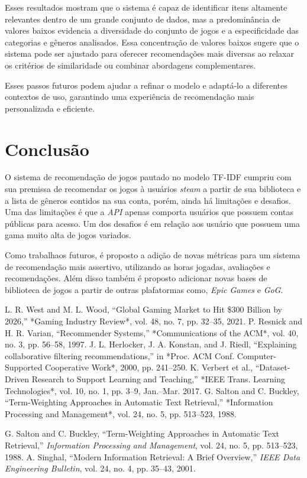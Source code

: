 \documentclass[conference]{IEEEtran}
\begin{document}
Esses resultados mostram que o sistema é capaz de identificar itens altamente relevantes dentro de um grande conjunto de dados, mas a predominância de valores baixos evidencia a diversidade do conjunto de jogos e a especificidade das categorias e gêneros analisados. Essa concentração de valores baixos sugere que o sistema pode ser ajustado para oferecer recomendações mais diversas ao relaxar os critérios de similaridade ou combinar abordagens complementares.



Esses passos futuros podem ajudar a refinar o modelo e adaptá-lo a diferentes contextos de uso, garantindo uma experiência de recomendação mais personalizada e eficiente.



\section{Conclusão}

O sistema de recomendação de jogos pautado no modelo TF-IDF cumpriu com sua premissa de recomendar os jogos à usuários \textit{steam} a partir de sua biblioteca e a lista de gêneros contidos na sua conta, porém, ainda há limitações e desafios. Uma das limitações é que a \textit{API} apenas comporta usuários que possuem contas públicas para acesso. Um dos desafios é em relação aos usuário que possuem uma gama muito alta de jogos variados.

Como trabalhaos futuros, é proposto a adição de novas métricas para um sistema de recomendação mais assertivo, utilizando as horas jogadas, avaliações e recomendações. Além disso também é proposto adicionar novas bases de biblioteca de jogos a partir de outras plafatormas como, \textit{Epic Games} e \textit{GoG}.

\begin{thebibliography}{99}

 L. R. West and M. L. Wood, ``Global Gaming Market to Hit \$300 Billion by 2026,'' *Gaming Industry Review*, vol. 48, no. 7, pp. 32–35, 2021.
 P. Resnick and H. R. Varian, ``Recommender Systems,'' *Communications of the ACM*, vol. 40, no. 3, pp. 56–58, 1997.
 J. L. Herlocker, J. A. Konstan, and J. Riedl, ``Explaining collaborative filtering recommendations,'' in *Proc. ACM Conf. Computer-Supported Cooperative Work*, 2000, pp. 241–250.
 K. Verbert et al., ``Dataset-Driven Research to Support Learning and Teaching,'' *IEEE Trans. Learning Technologies*, vol. 10, no. 1, pp. 3–9, Jan.–Mar. 2017.
 G. Salton and C. Buckley, ``Term-Weighting Approaches in Automatic Text Retrieval,'' *Information Processing and Management*, vol. 24, no. 5, pp. 513–523, 1988.

 G. Salton and C. Buckley, ``Term-Weighting Approaches in Automatic Text Retrieval,'' \textit{Information Processing and Management}, vol. 24, no. 5, pp. 513–523, 1988.
 A. Singhal, ``Modern Information Retrieval: A Brief Overview,'' \textit{IEEE Data Engineering Bulletin}, vol. 24, no. 4, pp. 35–43, 2001.


\end{thebibliography}
\end{document}
